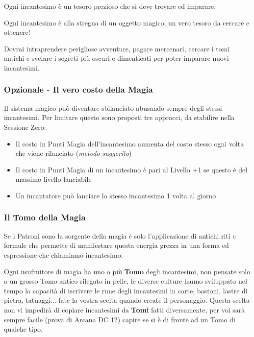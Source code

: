 \begin{multicols}{2}
\begin{changemargin}{0.3cm}{0.3cm}\begin{tcolorbox}[title = Scegliere gli Incantesimi]
Ogni incantesimo è un tesoro prezioso che si deve trovare ed imparare.

Ogni incantesimo è alla stregua di un oggetto magico, un vero tesoro da cercare e ottenere!

Dovrai intraprendere perigliose avventure, pagare mercenari, cercare i tomi antichi e svelare i segreti più oscuri e dimenticati per poter imparare nuovi incantesimi.
\end{tcolorbox}\end{changemargin}


\subsubsection{Opzionale - Il vero costo della Magia}

Il sistema magico può diventare sbilanciato abusando sempre degli stessi incantesimi. Per limitare questo sono proposti tre approcci, da stabilire nella Sessione Zero:

\begin{itemize}[leftmargin=*] \setlength{\itemsep}{0pt}
\item Il costo in Punti Magia dell'incantesimo aumenta del costo stesso ogni volta che viene rilanciato (\emph{metodo suggerito})
\item Il costo in Punti Magia di un incantesimo è pari al Livello +1 se questo è del massimo livello lanciabile
\item Un incantatore può lanciare lo stesso incantesimo 1 volta al giorno
\end{itemize}

\subsubsection{Il Tomo della Magia}\label{magietomodellamagia}

Se i Patroni sono la sorgente della magia è solo l'applicazione di antichi riti e formule che permette di manifestare questa energia grezza in una forma ed espressione che chiamiamo incantesimo.

Ogni usufruitore di magia ha uno o più \textbf{Tomo} degli incantesimi, non pensate solo a un grosso Tomo antico rilegato in pelle, le diverse culture hanno sviluppato nel tempo la capacità di iscrivere le rune degli incantesimi in carte, bastoni, lastre di pietra, tatuaggi... fate la vostra scelta quando create il personaggio.
Questa scelta non vi impedirà di copiare incantesimi da \textbf{Tomi} fatti diversamente, per voi sarà sempre facile (prova di Arcana DC 12) capire se si è di fronte ad un Tomo di qualche tipo.


\end{multicols}
